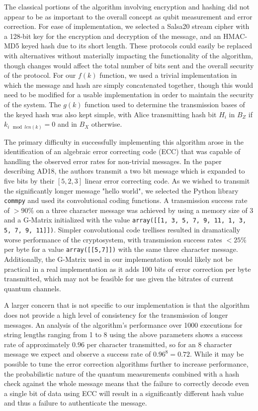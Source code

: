 \documentclass[sigconf]{acmart}
\begin{document}
The classical portions of the algorithm involving encryption and hashing did not appear to be as important to the overall concept as qubit measurement and error correction. For ease of implementation, we selected a Salsa20 stream cipher with a 128-bit key for the encryption and decryption of the message, and an HMAC-MD5 keyed hash due to its short length. These protocols could easily be replaced with alternatives without materially impacting the functionality of the algorithm, though changes would affect the total number of bits sent and the overall security of the protocol. For our $f(k)$ function, we used a trivial implementation in which the message and hash are simply concatenated together, though this would need to be modified for a usable implementation in order to maintain the security of the system. The $g(k)$ function used to determine the transmission bases of the keyed hash was also kept simple, with Alice transmitting hash bit $H_i$ in $B_Z$ if $k_{i \mod len(k)} = 0$ and in $B_X$ otherwise.

The primary difficulty in successfully implementing this algorithm arose in the identification of an algebraic error correcting code (ECC) that was capable of handling the observed error rates for non-trivial messages. In the paper describing AD18, the authors transmit a two bit message which is expanded to five bits by their $[5,2,3]$ linear error correcting code. As we wished to transmit the significantly longer message "hello world", we selected the Python library \texttt{commpy} and used its convolutional coding functions. A transmission success rate of $>90\%$ on a three character message was achieved by using a memory size of 3 and a G-Matrix initialized with the value \texttt{array([[1, 3, 5, 7, 9, 11, 1, 3, 5, 7, 9, 11]])}. Simpler convolutional code trellises %
resulted in dramatically worse performance of the cryptosystem, with transmission success rates $<25\%$ per byte for a value \texttt{array([[5,7]])} with the same three character message. %
Additionally, the G-Matrix used in our implementation would likely not be practical in a real implementation as it adds 100 bits of error correction per byte transmitted, which may not be feasible for use given the bitrates of current quantum channels.

A larger concern that is not specific to our implementation is that the algorithm does not provide a high level of consistency for the transmission of longer messages. An analysis of the algorithm's performance over 1000 executions for string lengths ranging from 1 to 8 using the above parameters shows a success rate of approximately $0.96$ per character transmitted, so for an 8 character message we expect and observe a success rate of $0.96^8 = 0.72$. While it may be possible to tune the error correction algorithms further to increase performance, the probabilistic nature of the quantum measurements combined with a hash check against the whole message means that the failure to correctly decode even a single bit of data using ECC will result in a significantly different hash value and thus a failure to authenticate the message.
\end{document}

